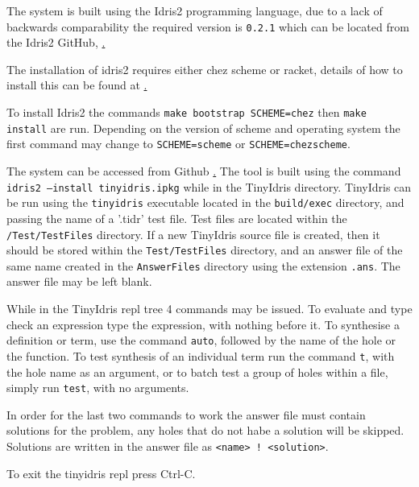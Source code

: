 \documentclass[a4paper]{article}
\begin{document}
The system is built using the Idris2 programming language, due to
a lack of backwards comparability the required version is
\texttt{0.2.1} which can be located from the Idris2 GitHub,
\href{https://github.com/idris-lang/Idris2/tree/compat-0.2.1}.

The installation of idris2 requires either chez scheme or racket,
details of how to install this can be found at
\href{https://www.scheme.com/}.

To install Idris2 the commands \texttt{make bootstrap SCHEME=chez}
then \texttt{make install} are run. Depending on the version of
scheme and operating system the first command may change to
\texttt{SCHEME=scheme} or \texttt{SCHEME=chezscheme}. 


The system can be accessed from Github \href{https://github.com/Ablach/tiny-idris-program-synthesis}. The tool is built using the command
\texttt{idris2 --install tinyidris.ipkg} while in the TinyIdris
directory. TinyIdris can be run using the \texttt{tinyidris}
executable located in the \texttt{build/exec} directory, and passing
the name of a '.tidr' test file. Test files are located within the \texttt{/Test/TestFiles} directory. If a new TinyIdris source file is created, then it
should be stored within the \texttt{Test/TestFiles}
directory, and an answer file of the same name created in the
\texttt{AnswerFiles} directory using the extension \texttt{.ans}.
The answer file may be left blank. 

While in the TinyIdris repl tree 4 commands may be issued. To evaluate
and type check an expression type the expression, with nothing before
it. To synthesise a definition or term, use the command \texttt{auto},
followed by the name of the hole or the function.
To test synthesis of an individual term run the command \texttt{t},
with the hole name as an argument, or to batch test a group of holes
within a file, simply run \texttt{test}, with no arguments.

In order for the last two commands to work the answer file must contain
solutions for the problem, any holes that do not habe a solution will
be skipped. Solutions are written in the answer file as
\texttt{<name> ! <solution>}.

To exit the tinyidris repl press Ctrl-C.
\end{document}
